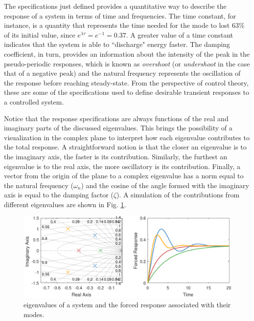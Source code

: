 \documentclass[a4paper,11pt]{book}
\numberwithin{figure}{chapter}
\numberwithin{equation}{chapter}
\numberwithin{table}{chapter}
\theoremstyle{definition}
\begin{document}
The specifications just defined provides a quantitative way to describe the response of a system in terms of time and frequencies. The time constant, for instance, is a quantity that represents the time needed for the mode to lost $63\%$ of its initial value, since $e^{\lambda \tau} = e^{-1} = 0.37$. A greater value of a time constant indicates that the system is able to ``discharge" energy faster. The damping coefficient, in turn, provides an information about the intensity of the peak in the pseudo-periodic responses, which is known as \textit{overshoot} (or \textit{undershoot} in the case that of a negative peak) and the natural frequency represents the oscillation of the response before reaching steady-state. From the perspective of control theory, these are some of the specifications used to define desirable transient responses to a controlled system.

Notice that the response specifications are always functions of the real and imaginary parts of the discussed eigenvalues. This brings the possibility of a visualization in the complex plane to interpret how each eigenvalue contributes to the total response. A straightforward notion is that the closer an eigenvalue is to the imaginary axis, the faster is its contribution. Similarly, the furthest an eigenvalue is to the real axis, the more oscillatory is its contribution. Finally, a vector from the origin of the plane to a complex eigenvalue has a norm equal to the natural frequency ($\omega_n$) and the cosine of the angle formed with the imaginary axis is equal to the damping factor ($\zeta$). A simulation of the contributions from different eigenvalues are shown in Fig. \ref{fig:eigen01}.

\begin{figure}[ht]
	\centering
	\includegraphics[width=\textwidth]{chapter2/eigen01}
	\caption{eigenvalues of a system and the forced response associated with their modes.}
	\label{fig:eigen01}
\end{figure}
\end{document}
